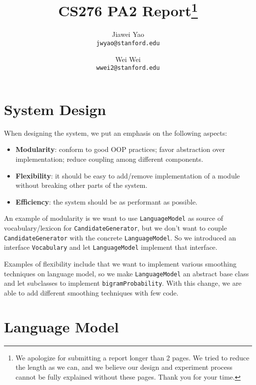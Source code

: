 \documentclass{article}
\begin{document}
\title{CS276 PA2 Report\footnote{We apologize for submitting a report longer than 2 pages. We tried to reduce the length as we can, and we believe our design and experiment process cannot be fully explained without these pages. Thank you for your time.}}

\author{
  Jiawei Yao\\
  \texttt{jwyao@stanford.edu}
  \and
  Wei Wei\\
  \texttt{wwei2@stanford.edu}
}

\maketitle

\section{System Design}

When designing the system, we put an emphasis on the following aspects:

\begin{itemize}
    \item \textbf{Modularity}: conform to good OOP practices; favor abstraction over implementation; reduce coupling among different components.
    \item \textbf{Flexibility}: it should be easy to add/remove implementation of a module without breaking other parts of the system.
    \item \textbf{Efficiency}: the system should be as performant as possible.
\end{itemize}

An example of modularity is we want to use \texttt{LanguageModel} as source of vocabulary/lexicon for \texttt{CandidateGenerator}, but we don't want to couple \texttt{CandidateGenerator} with the concrete \texttt{LanguageModel}. So we introduced an interface \texttt{Vocabulary} and let \texttt{LanguageModel} implement that interface.

Examples of flexibility include that we want to implement various smoothing techniques on language model, so we make \texttt{LanguageModel} an abstract base class and let subclasses to implement \texttt{bigramProbability}. With this change, we are able to add different smoothing techniques with few code.

\section{Language Model}
\end{document}
